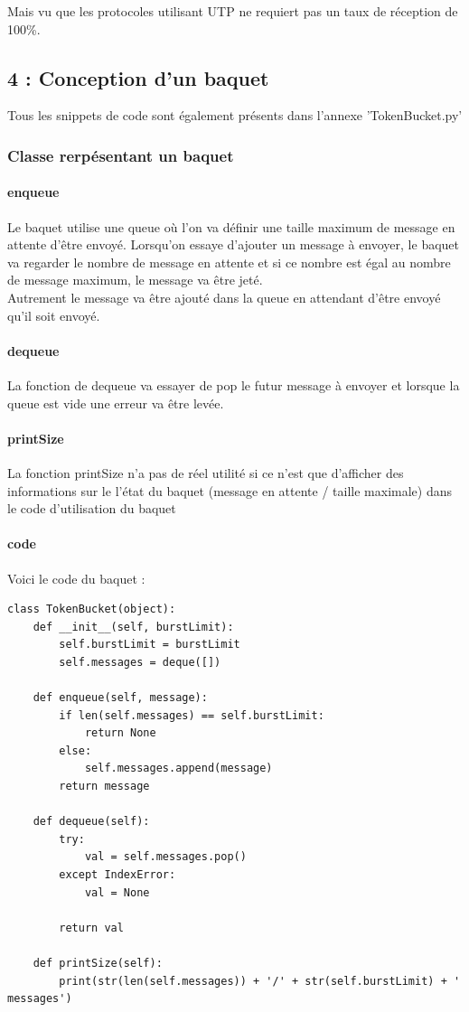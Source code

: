 \documentclass{article}
\begin{document}
Mais vu que les protocoles utilisant UTP ne requiert pas un taux de réception de 100\%. 

\subsection*{4 : Conception d'un baquet}

Tous les snippets de code sont également présents dans l'annexe 'TokenBucket.py'

\subsubsection{Classe rerpésentant un baquet}

\paragraph{enqueue}

Le baquet utilise une queue où l'on va définir une taille maximum de message en attente d'être envoyé. Lorsqu'on essaye d'ajouter un message à envoyer, le baquet va regarder le nombre de message en attente et si ce nombre est égal au nombre de message maximum, le message va être jeté.\\

Autrement le message va être ajouté dans la queue en attendant d'être envoyé qu'il soit envoyé.

\paragraph{dequeue}

La fonction de dequeue va essayer de pop le futur message à envoyer et lorsque la queue est vide une erreur va être levée.

\paragraph{printSize}

La fonction printSize n'a pas de réel utilité si ce n'est que d'afficher des informations sur le l'état du baquet (message en attente / taille maximale) dans le code d'utilisation du baquet

\paragraph{code}

Voici le code du baquet : 

\begin{lstlisting}
class TokenBucket(object):
	def __init__(self, burstLimit):
		self.burstLimit = burstLimit
		self.messages = deque([])
	
	def enqueue(self, message):
		if len(self.messages) == self.burstLimit:
			return None
		else:
			self.messages.append(message)
		return message
	
	def dequeue(self):
		try:
			val = self.messages.pop()
		except IndexError:
			val = None
		
		return val
	
	def printSize(self):
		print(str(len(self.messages)) + '/' + str(self.burstLimit) + ' messages')
\end{lstlisting}
\end{document}
